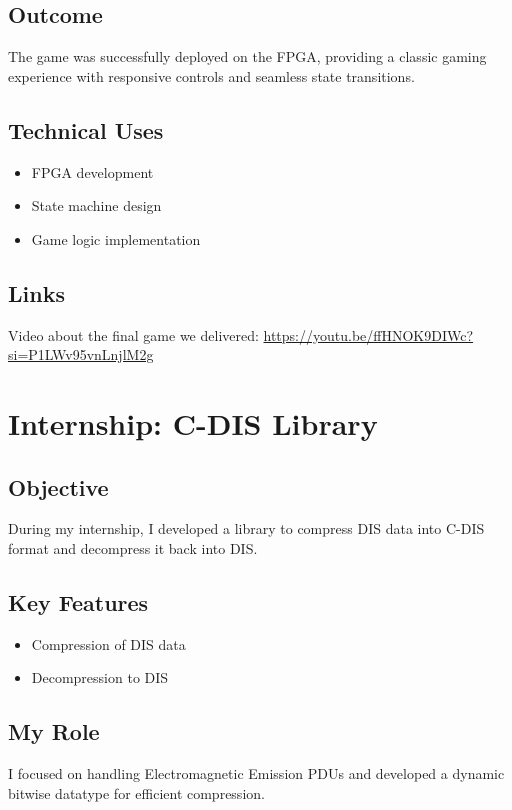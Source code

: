 \documentclass{article}
\begin{document}
\subsection{Outcome}
The game was successfully deployed on the FPGA, providing a classic gaming experience with responsive controls and seamless state transitions.

\subsection{Technical Uses}
\begin{itemize}
    \item FPGA development
    \item State machine design
    \item Game logic implementation
\end{itemize}

\subsection{Links}
Video about the final game we delivered:
\url{https://youtu.be/ffHNOK9DIWc?si=P1LWv95vnLnjlM2g}



\section{Internship: C-DIS Library}
\subsection{Objective}
During my internship, I developed a library to compress DIS data into C-DIS format and decompress it back into DIS.

\subsection{Key Features}
\begin{itemize}
    \item Compression of DIS data
    \item Decompression to DIS
\end{itemize}

\subsection{My Role}
I focused on handling Electromagnetic Emission PDUs and developed a dynamic bitwise datatype for efficient compression.
\end{document}
